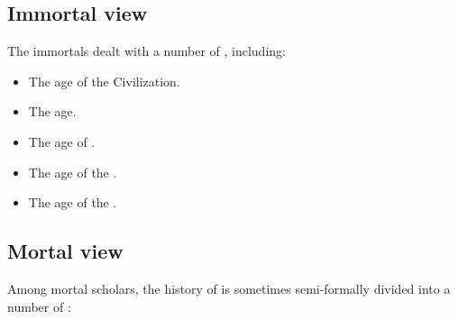 \subsection{Immortal view}
The immortals dealt with a number of , including:

\begin{itemize}
  \item The age of the \Ophidian Civilization.
  \item The  age.
  \item The age of .
  \item The age of the .
  \item The age of the . 
\end{itemize}










\subsection{Mortal view}
Among mortal scholars, the history of \Miith{} is sometimes semi-formally divided into a number of : 

